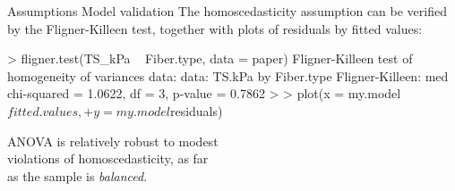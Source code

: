 \documentclass[t]{beamer}
\begin{document}
\begin{ftstf}
{Assumptions}
{Model validation}
The homoscedasticity assumption can be verified by the Fligner-Killeen test, together with plots of residuals by fitted values:
\begin{rcode}
> fligner.test(TS_kPa ~ Fiber.type, data = paper)
Fligner-Killeen test of homogeneity of
variances
data:  data:  TS.kPa by Fiber.type
Fligner-Killeen:
med chi-squared = 1.0622, df = 3, 
p-value = 0.7862
>
> plot(x = my.model$fitted.values,
+      y = my.model$residuals) 

\end{rcode}
\vhalf
ANOVA is relatively robust to modest\\
violations of homoscedasticity, as far\\
as the sample is \textit{balanced}.
\end{ftstf}

\end{document}

